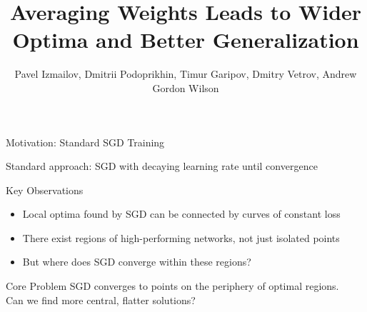 \documentclass{beamer}
\title{Averaging Weights Leads to Wider Optima and Better Generalization}
\author{Pavel Izmailov, Dmitrii Podoprikhin, Timur Garipov, Dmitry Vetrov, Andrew Gordon Wilson}
\institute{Talk by Gleb Karpeev}
\date{}
\begin{document}
\begin{frame}
\titlepage
\end{frame}

\begin{frame}{Motivation: Standard SGD Training}

Standard approach: SGD with decaying learning rate until convergence

\vspace{0.5cm}

\begin{block}{Key Observations}
\begin{itemize}
    \item Local optima found by SGD can be connected by curves of constant loss
    \item There exist regions of high-performing networks, not just isolated points
    \item But where does SGD converge within these regions?
\end{itemize}
\end{block}

\vspace{0.3cm}

\begin{alertblock}{Core Problem}
SGD converges to points on the periphery of optimal regions.\\
Can we find more central, flatter solutions?
\end{alertblock}

\end{frame}
\end{document}

